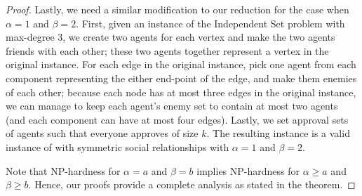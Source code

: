 \begin{proof}
	Lastly, we need a similar modification to our reduction for the case when $\alpha = 1$ and $\beta = 2$. 
	First, given an instance of the Independent Set problem with max-degree 3, we create two agents for each vertex and make the two agents friends with each other; these two agents together represent a vertex in the original instance.
	For each edge in the original instance, pick one agent from each component representing the either end-point of the edge, and make them enemies of each other; because each node has at most three edges in the original instance, we can manage to keep each agent's enemy set to contain at most two agents (and each component can have at most four edges). Lastly, we set approval sets of agents such that everyone approves of size $k$. The resulting instance is a valid instance of \SIPs with symmetric social relationships with $\alpha = 1$ and $\beta = 2$. 
 	
	Note that NP-hardness for $\alpha = a$ and $\beta = b$ implies NP-hardness for $\alpha \geq a$ and $\beta \geq b$.
	Hence, our proofs provide a complete analysis as stated in the theorem.
	
\end{proof}


